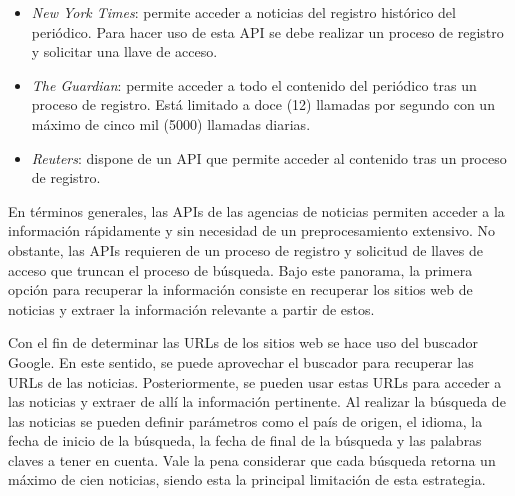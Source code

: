 \begin{itemize}
    \item \textit{New York Times}: permite acceder a noticias del registro histórico del periódico. Para hacer uso de esta API se debe realizar un proceso de registro y solicitar una llave de acceso.
    
    \item \textit{The Guardian}: permite acceder a todo el contenido del periódico tras un proceso de registro. Está limitado a doce (12) llamadas por segundo con un máximo de cinco mil (5000) llamadas diarias.
    
    \item \textit{Reuters}: dispone de un API que permite acceder al contenido tras un proceso de registro.
\end{itemize}

En términos generales, las APIs de las agencias de noticias permiten acceder a la información rápidamente y sin necesidad de un preprocesamiento extensivo. No obstante, las APIs requieren de un proceso de registro y solicitud de llaves de acceso que truncan el proceso de búsqueda. Bajo este panorama, la primera opción para recuperar la información consiste en recuperar los sitios web de noticias y extraer la información relevante a partir de estos. 

Con el fin de determinar las URLs de los sitios web se hace uso del buscador Google. En este sentido, se puede aprovechar el buscador para recuperar las URLs de las noticias. Posteriormente, se pueden usar estas URLs para acceder a las noticias y extraer de allí la información pertinente. Al realizar la búsqueda de las noticias se pueden definir parámetros como el país de origen, el idioma, la fecha de inicio de la búsqueda, la fecha de final de la búsqueda y las palabras claves a tener en cuenta. Vale la pena considerar que cada búsqueda retorna un máximo de cien noticias, siendo esta la principal limitación de esta estrategia.